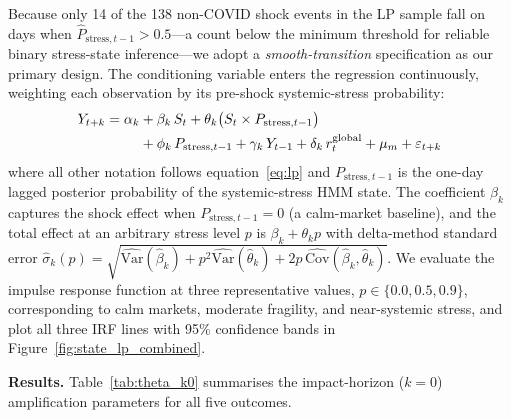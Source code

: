\documentclass[11pt]{article}
\begin{document}
Because only 14 of the 138 non-COVID shock events in the LP sample fall
on days when $\hat{P}_{\text{stress},t-1} > 0.5$---a count below the minimum
threshold for reliable binary stress-state inference---we adopt a
\emph{smooth-transition} specification as our primary design. The
conditioning variable enters the regression continuously, weighting each
observation by its pre-shock systemic-stress probability:
%
\begin{align}
  Y_{t+k} = \alpha_k
    &+ \beta_k \, S_t
     + \theta_k \bigl(S_t \times P_{\text{stress},t-1}\bigr) \notag \\
    &+ \phi_k \, P_{\text{stress},t-1}
     + \gamma_k \, Y_{t-1}
     + \delta_k \, r^{\text{global}}_t
     + \mu_m
     + \varepsilon_{t+k}
  \label{eq:smooth_lp}
\end{align}
%
where all other notation follows equation~\eqref{eq:lp} and
$P_{\text{stress},t-1}$ is the one-day lagged posterior probability of the
systemic-stress HMM state. The coefficient $\beta_k$ captures the shock
effect when $P_{\text{stress},t-1} = 0$ (a calm-market baseline), and the
total effect at an arbitrary stress level $p$ is $\beta_k + \theta_k p$
with delta-method standard error
$\hat{\sigma}_k(p) = \sqrt{\widehat{\mathrm{Var}}(\hat{\beta}_k)
  + p^2 \widehat{\mathrm{Var}}(\hat{\theta}_k)
  + 2p\,\widehat{\mathrm{Cov}}(\hat{\beta}_k, \hat{\theta}_k)}$.
We evaluate the impulse response function at three representative values,
$p \in \{0.0, 0.5, 0.9\}$, corresponding to calm markets, moderate
fragility, and near-systemic stress, and plot all three IRF lines with
95\% confidence bands in Figure~\ref{fig:state_lp_combined}.

\textbf{Results.}
Table~\ref{tab:theta_k0} summarises the impact-horizon ($k=0$)
amplification parameters for all five outcomes.
\end{document}
